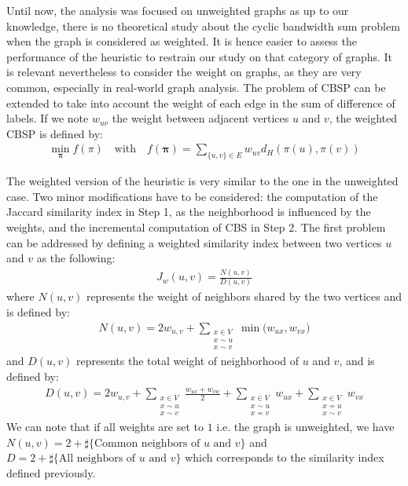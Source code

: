 \documentclass{scrartcl}
\theoremstyle{plain}
\newcommand{\cbs}{CBS}
\newcommand{\cbsp}{CBSP}
\begin{document}
Until now, the analysis was focused on unweighted graphs as up to our knowledge, 
there is no theoretical study about the cyclic bandwidth sum problem when the 
graph is considered as weighted. It is hence easier to assess the performance of 
the heuristic to restrain our study on that category of graphs. It is relevant 
nevertheless to consider the weight on graphs, as they are very common, 
especially in real-world graph analysis. The problem of \cbsp{} can be extended 
to take into account the weight of each edge in the sum of difference of labels. 
If we note $w_{uv}$ the weight between adjacent vertices $u$ and $v$, the 
weighted \cbsp{} is defined by:
\begin{align}
\min_{\mathbf{\pi}} f(\pi)\quad \text{with} \quad f(\mathbf{\pi})= 
\sum_{\{u,v\}\in E}w_{uv} d_H(\pi(u),\pi(v))
\end{align}

The weighted version of the heuristic is very similar to the one in the 
unweighted case. Two minor modifications have to be considered: the computation 
of the Jaccard similarity index in Step 1, as the neighborhood is influenced by 
the 
weights, and the incremental computation of \cbs{} in Step 2. The first problem 
can be addressed by defining a weighted similarity index between two vertices 
$u$ and $v$ as the following: 
\begin{align}
J_w(u,v) = \frac{N(u,v)}{D(u,v)}
\end{align}
where $N(u,v)$ represents the weight of neighbors shared by the two vertices and 
is defined by:
\begin{align}
N(u,v) =  2w_{u,v} + \sum_{\substack{x \in V \\ x\sim u \\ 
x\sim v}} {\min(w_{ux}, w_{vx}})
\end{align} 
and $D(u,v)$ represents the total weight of neighborhood of $u$ and $v$, and is 
defined by:
\begin{align}
D(u,v) =  2w_{u,v} + \sum_{\substack{x \in V \\ x\sim u \\ x\sim v}} 
{\frac{w_{ux} + w_{vw}}{2}} +  \sum_{\substack{x \in V \\ x\sim u \\ x\nsim 
v}}w_{ux} +   \sum_{\substack{x \in V \\ x\nsim u \\ x\sim v}}w_{vx}
\end{align}
We can note that if all weights are set to $1$ i.e. the graph is unweighted, we 
have $N(u,v) = 2 + \sharp\{\text{Common neighbors of $u$ and $v$}\}$ and $D = 
2 + \sharp\{\text{All neighbors of $u$ and $v$}\}$ which corresponds to the 
similarity index defined previously.
\end{document}
